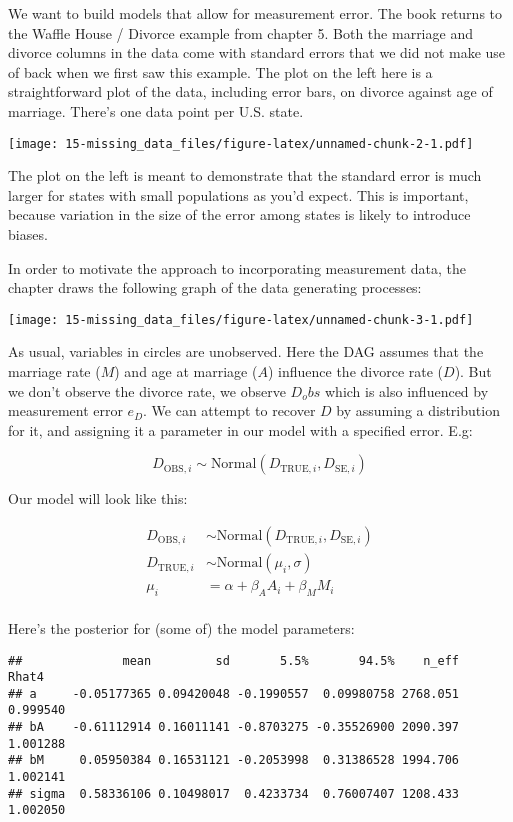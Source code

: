 \documentclass[
]{book}
\begin{document}
We want to build models that allow for measurement error. The book returns to the Waffle House / Divorce example from chapter 5. Both the marriage and divorce columns in the data come with standard errors that we did not make use of back when we first saw this example. The plot on the left here is a straightforward plot of the data, including error bars, on divorce against age of marriage. There's one data point per U.S. state.

\texttt{[image: 15-missing\_data\_files/figure-latex/unnamed-chunk-2-1.pdf]}

The plot on the left is meant to demonstrate that the standard error is much larger for states with small populations as you'd expect. This is important, because variation in the size of the error among states is likely to introduce biases.

In order to motivate the approach to incorporating measurement data, the chapter draws the following graph of the data generating processes:

\texttt{[image: 15-missing\_data\_files/figure-latex/unnamed-chunk-3-1.pdf]}

As usual, variables in circles are unobserved. Here the DAG assumes that the marriage rate (\(M\)) and age at marriage (\(A\)) influence the divorce rate (\(D\)). But we don't observe the divorce rate, we observe \(D_obs\) which is also influenced by measurement error \(e_D\). We can attempt to recover \(D\) by assuming a distribution for it, and assigning it a parameter in our model with a specified error. E.g:

\[
D_{\text{OBS},i} \sim \text{Normal}(D_{\text{TRUE},i},D_{\text{SE},i})
\]

Our model will look like this:

\[
\begin{aligned}
D_{\text{OBS},i} &\sim \text{Normal}(D_{\text{TRUE},i},D_{\text{SE},i}) \\
D_{\text{TRUE},i} &\sim \text{Normal}(\mu_i,\sigma) \\
\mu_i &= \alpha + \beta_A A_i + \beta_M M_i\\
\end{aligned}
\]

Here's the posterior for (some of) the model parameters:

\begin{verbatim}
##              mean         sd       5.5%       94.5%    n_eff    Rhat4
## a     -0.05177365 0.09420048 -0.1990557  0.09980758 2768.051 0.999540
## bA    -0.61112914 0.16011141 -0.8703275 -0.35526900 2090.397 1.001288
## bM     0.05950384 0.16531121 -0.2053998  0.31386528 1994.706 1.002141
## sigma  0.58336106 0.10498017  0.4233734  0.76007407 1208.433 1.002050
\end{verbatim}
\end{document}
